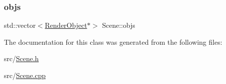 \mbox{\label{classScene_a37361b6054643b62fcb8e6b7c828e5dd}} 
\subsubsection{\texorpdfstring{objs}{objs}}
{\footnotesize\ttfamily std\+::vector$<$\mbox{\hyperlink{classRenderObject}{Render\+Object}}$\ast$$>$ Scene\+::objs\hspace{0.3cm}{\ttfamily [private]}}



The documentation for this class was generated from the following files\+:\begin{DoxyCompactItemize}
\item 
src/\mbox{\hyperlink{Scene_8h}{Scene.\+h}}\item 
src/\mbox{\hyperlink{Scene_8cpp}{Scene.\+cpp}}\end{DoxyCompactItemize}
